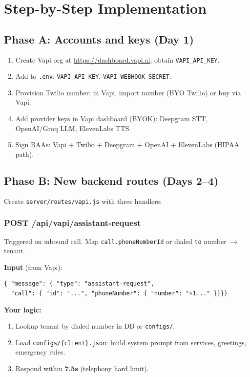 \documentclass[11pt,a4paper]{article}
\begin{document}
\section{Step-by-Step Implementation}

\subsection{Phase A: Accounts and keys (Day 1)}
\begin{enumerate}
  \item Create Vapi org at \url{https://dashboard.vapi.ai}; obtain \texttt{VAPI\_API\_KEY}.
  \item Add to \texttt{.env}: \texttt{VAPI\_API\_KEY}, \texttt{VAPI\_WEBHOOK\_SECRET}.
  \item Provision Twilio number; in Vapi, import number (BYO Twilio) or buy via Vapi.
  \item Add provider keys in Vapi dashboard (BYOK): Deepgram STT, OpenAI/Groq LLM, ElevenLabs TTS.
  \item Sign BAAs: Vapi + Twilio + Deepgram + OpenAI + ElevenLabs (HIPAA path).
\end{enumerate}

\subsection{Phase B: New backend routes (Days 2--4)}

Create \texttt{server/routes/vapi.js} with three handlers:

\subsubsection{POST /api/vapi/assistant-request}
Triggered on inbound call. Map \texttt{call.phoneNumberId} or dialed \texttt{to} number $\rightarrow$ tenant.

\textbf{Input} (from Vapi):
\begin{verbatim}
{ "message": { "type": "assistant-request",
  "call": { "id": "...", "phoneNumber": { "number": "+1..." }}}}
\end{verbatim}

\textbf{Your logic:}
\begin{enumerate}
  \item Lookup tenant by dialed number in DB or \texttt{configs/}.
  \item Load \texttt{configs/\{client\}.json}; build system prompt from services, greetings, emergency rules.
  \item Respond within \textbf{7.5s} (telephony hard limit).
\end{enumerate}
\end{document}
